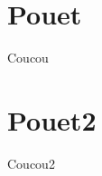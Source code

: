 \documentclass[twoside]{article}
\begin{document}
\makeRR

%
%
%

\newpage
\section{Pouet}
Coucou

\newpage
\section{Pouet2}
Coucou2
%
%	
%	
%	
%
%	
%	
%	
%
\end{document}
